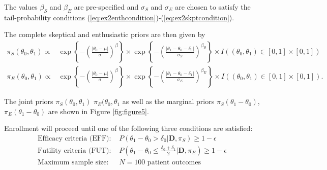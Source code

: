 \documentclass[12pt]{article}
\begin{document}
The values $\beta_S$ and $\beta_E$ are pre-specified and $\sigma_S$ and $\sigma_E$ are chosen to satisfy the tail-probability conditions 
(\ref{eq:ex2enthcondition})-(\ref{eq:ex2skptcondition}).

The complete skeptical and enthusiastic priors are then given by 
\begin{align}
\pi_S(\theta_0,\theta_1)\propto&\exp\left\{-\left(\frac{|\theta_0-\mu|}{\sigma}\right)^{\beta}\right\}\times \exp\left\{-\left(\frac{|\theta_1-\theta_0-\delta_0|}{\sigma_S}\right)^{\beta_S}\right\}\times I((\theta_0,\theta_1)\in [0,1]\times[0,1])\label{eq:ex2skpt}\\
\pi_E(\theta_0,\theta_1)\propto&\exp\left\{-\left(\frac{|\theta_0-\mu|}{\sigma}\right)^{\beta}\right\}\times \exp\left\{-\left(\frac{|\theta_1-\theta_0-\delta_1|}{\sigma_E}\right)^{\beta_E}\right\}\times I((\theta_0,\theta_1)\in [0,1]\times[0,1])\label{eq:ex2enth}.
\end{align}

The joint priors $\pi_S(\theta_0,\theta_1)$ $\pi_E(\theta_0,\theta_1$ as well as the marginal priors $\pi_S(\theta_1-\theta_0)$, $\pi_E(\theta_1-\theta_0)$ are shown in Figure \ref{fig:figure5}.
%



%				

Enrollment will proceed until one of the following three conditions are satisfied:
\begin{align}
\text{Efficacy criteria (EFF): }&P(\theta_1-\theta_0>\delta_0|\mathbf{D},\pi_S)\geq 1-\epsilon\\
\text{Futility criteria (FUT): }&P\left(\theta_1-\theta_0 \leq \frac{\delta_0+\delta_1}{2}\Big|\mathbf{D},\pi_E\right)\geq 1-\epsilon\\
\text{Maximum sample size: }&N=100 \text{ patient outcomes}
\end{align}
\end{document}
